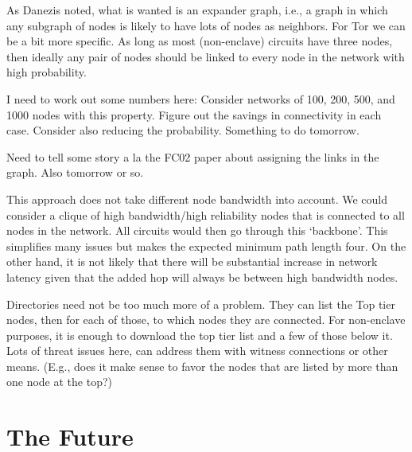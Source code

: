 \documentclass{llncs}
\begin{document}
As Danezis noted, what is wanted is an expander graph, i.e., a graph
in which any subgraph of nodes is likely to have lots of nodes as
neighbors. For Tor we can be a bit more specific. As long as most
(non-enclave) circuits have three nodes, then ideally any pair of nodes
should be linked to every node in the network with high probability.

I need to work out some numbers here: Consider networks of 100,
200, 500, and 1000 nodes with this property. Figure out the savings
in connectivity in each case. Consider also reducing the probability.
Something to do tomorrow.

Need to tell some story a la the FC02 paper about assigning the
links in the graph. Also tomorrow or so.

This approach does not take different node bandwidth into account. We
could consider a clique of high bandwidth/high reliability nodes that
is connected to all nodes in the network. All circuits would then go
through this `backbone'. This simplifies many issues but makes the
expected minimum path length four. On the other hand, it is not
likely that there will be substantial increase in network latency
given that the added hop will always be between high bandwidth nodes.

Directories need not be too much more of a problem. They can list the
Top tier nodes, then for each of those, to which nodes they are
connected.  For non-enclave purposes, it is enough to download the top
tier list and a few of those below it.  Lots of threat issues here,
can address them with witness connections or other means. (E.g., does
it make sense to favor the nodes that are listed by more than one node
at the top?)




\section{The Future}
\label{sec:conclusion}


 
\end{document}
